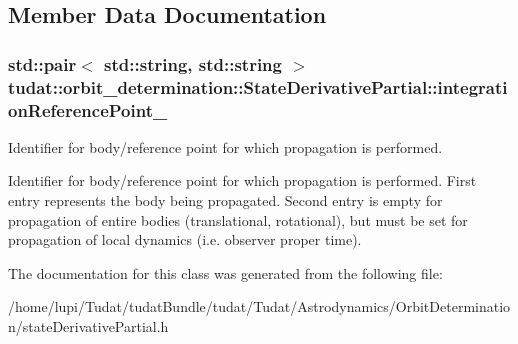 \subsection{Member Data Documentation}
\subsubsection[{\texorpdfstring{integration\+Reference\+Point\+\_\+}{integrationReferencePoint_}}]{\setlength{\rightskip}{0pt plus 5cm}std\+::pair$<$ std\+::string, std\+::string $>$ tudat\+::orbit\+\_\+determination\+::\+State\+Derivative\+Partial\+::integration\+Reference\+Point\+\_\+\hspace{0.3cm}{\ttfamily [protected]}}\hypertarget{classtudat_1_1orbit__determination_1_1StateDerivativePartial_a0c30598298c59647e997203dc0ad664c}{}\label{classtudat_1_1orbit__determination_1_1StateDerivativePartial_a0c30598298c59647e997203dc0ad664c}


Identifier for body/reference point for which propagation is performed. 

Identifier for body/reference point for which propagation is performed. First entry represents the body being propagated. Second entry is empty for propagation of entire bodies (translational, rotational), but must be set for propagation of local dynamics (i.\+e. observer proper time). 

The documentation for this class was generated from the following file\+:\begin{DoxyCompactItemize}
\item 
/home/lupi/\+Tudat/tudat\+Bundle/tudat/\+Tudat/\+Astrodynamics/\+Orbit\+Determination/state\+Derivative\+Partial.\+h\end{DoxyCompactItemize}
